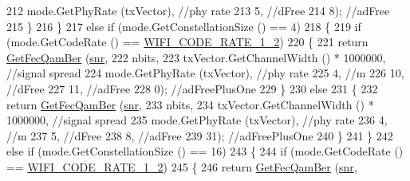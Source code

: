 \begin{DoxyCode}
212                                     mode.GetPhyRate (txVector), \textcolor{comment}{//phy rate}
213                                     5, \textcolor{comment}{//dFree}
214                                     8); \textcolor{comment}{//adFree}
215             \}
216         \}
217       \textcolor{keywordflow}{else} \textcolor{keywordflow}{if} (mode.GetConstellationSize () == 4)
218         \{
219           \textcolor{keywordflow}{if} (mode.GetCodeRate () == \hyperlink{namespacens3_aeaf3a86fd4bdb7829955238fba43e2ada66dfa017f6a74bcb72cdccfee778e90b}{WIFI\_CODE\_RATE\_1\_2})
220             \{
221               \textcolor{keywordflow}{return} \hyperlink{classns3_1_1YansErrorRateModel_a456a5ba3fc8c6a9fe67ed25971364ff0}{GetFecQamBer} (\hyperlink{lte__amc_8m_a7543c5e4e80c828b652e0c63e4a6de70}{snr},
222                                    nbits,
223                                    txVector.GetChannelWidth () * 1000000, \textcolor{comment}{//signal spread}
224                                    mode.GetPhyRate (txVector), \textcolor{comment}{//phy rate}
225                                    4, \textcolor{comment}{//m}
226                                    10, \textcolor{comment}{//dFree}
227                                    11, \textcolor{comment}{//adFree}
228                                    0); \textcolor{comment}{//adFreePlusOne}
229             \}
230           \textcolor{keywordflow}{else}
231             \{
232               \textcolor{keywordflow}{return} \hyperlink{classns3_1_1YansErrorRateModel_a456a5ba3fc8c6a9fe67ed25971364ff0}{GetFecQamBer} (\hyperlink{lte__amc_8m_a7543c5e4e80c828b652e0c63e4a6de70}{snr},
233                                    nbits,
234                                    txVector.GetChannelWidth () * 1000000, \textcolor{comment}{//signal spread}
235                                    mode.GetPhyRate (txVector), \textcolor{comment}{//phy rate}
236                                    4, \textcolor{comment}{//m}
237                                    5, \textcolor{comment}{//dFree}
238                                    8, \textcolor{comment}{//adFree}
239                                    31); \textcolor{comment}{//adFreePlusOne}
240             \}
241         \}
242       \textcolor{keywordflow}{else} \textcolor{keywordflow}{if} (mode.GetConstellationSize () == 16)
243         \{
244           \textcolor{keywordflow}{if} (mode.GetCodeRate () == \hyperlink{namespacens3_aeaf3a86fd4bdb7829955238fba43e2ada66dfa017f6a74bcb72cdccfee778e90b}{WIFI\_CODE\_RATE\_1\_2})
245             \{
246               \textcolor{keywordflow}{return} \hyperlink{classns3_1_1YansErrorRateModel_a456a5ba3fc8c6a9fe67ed25971364ff0}{GetFecQamBer} (\hyperlink{lte__amc_8m_a7543c5e4e80c828b652e0c63e4a6de70}{snr},

\end{DoxyCode}

